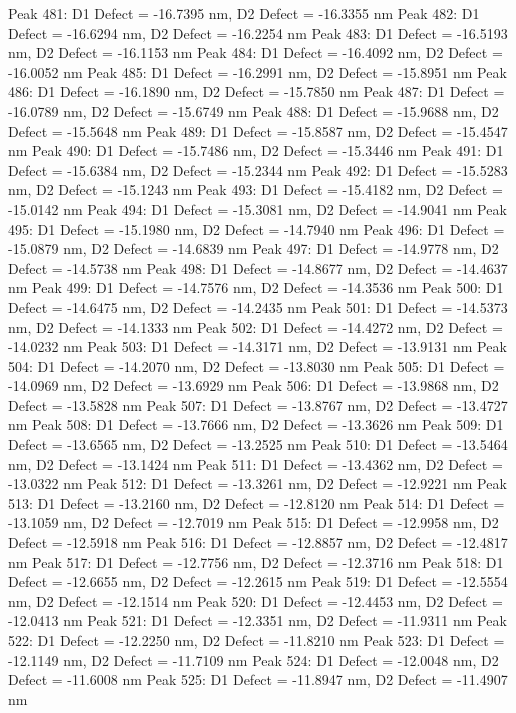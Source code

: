 \documentclass{article}
\begin{document}
Peak 481: D1 Defect = -16.7395 nm, D2 Defect = -16.3355 nm
Peak 482: D1 Defect = -16.6294 nm, D2 Defect = -16.2254 nm
Peak 483: D1 Defect = -16.5193 nm, D2 Defect = -16.1153 nm
Peak 484: D1 Defect = -16.4092 nm, D2 Defect = -16.0052 nm
Peak 485: D1 Defect = -16.2991 nm, D2 Defect = -15.8951 nm
Peak 486: D1 Defect = -16.1890 nm, D2 Defect = -15.7850 nm
Peak 487: D1 Defect = -16.0789 nm, D2 Defect = -15.6749 nm
Peak 488: D1 Defect = -15.9688 nm, D2 Defect = -15.5648 nm
Peak 489: D1 Defect = -15.8587 nm, D2 Defect = -15.4547 nm
Peak 490: D1 Defect = -15.7486 nm, D2 Defect = -15.3446 nm
Peak 491: D1 Defect = -15.6384 nm, D2 Defect = -15.2344 nm
Peak 492: D1 Defect = -15.5283 nm, D2 Defect = -15.1243 nm
Peak 493: D1 Defect = -15.4182 nm, D2 Defect = -15.0142 nm
Peak 494: D1 Defect = -15.3081 nm, D2 Defect = -14.9041 nm
Peak 495: D1 Defect = -15.1980 nm, D2 Defect = -14.7940 nm
Peak 496: D1 Defect = -15.0879 nm, D2 Defect = -14.6839 nm
Peak 497: D1 Defect = -14.9778 nm, D2 Defect = -14.5738 nm
Peak 498: D1 Defect = -14.8677 nm, D2 Defect = -14.4637 nm
Peak 499: D1 Defect = -14.7576 nm, D2 Defect = -14.3536 nm
Peak 500: D1 Defect = -14.6475 nm, D2 Defect = -14.2435 nm
Peak 501: D1 Defect = -14.5373 nm, D2 Defect = -14.1333 nm
Peak 502: D1 Defect = -14.4272 nm, D2 Defect = -14.0232 nm
Peak 503: D1 Defect = -14.3171 nm, D2 Defect = -13.9131 nm
Peak 504: D1 Defect = -14.2070 nm, D2 Defect = -13.8030 nm
Peak 505: D1 Defect = -14.0969 nm, D2 Defect = -13.6929 nm
Peak 506: D1 Defect = -13.9868 nm, D2 Defect = -13.5828 nm
Peak 507: D1 Defect = -13.8767 nm, D2 Defect = -13.4727 nm
Peak 508: D1 Defect = -13.7666 nm, D2 Defect = -13.3626 nm
Peak 509: D1 Defect = -13.6565 nm, D2 Defect = -13.2525 nm
Peak 510: D1 Defect = -13.5464 nm, D2 Defect = -13.1424 nm
Peak 511: D1 Defect = -13.4362 nm, D2 Defect = -13.0322 nm
Peak 512: D1 Defect = -13.3261 nm, D2 Defect = -12.9221 nm
Peak 513: D1 Defect = -13.2160 nm, D2 Defect = -12.8120 nm
Peak 514: D1 Defect = -13.1059 nm, D2 Defect = -12.7019 nm
Peak 515: D1 Defect = -12.9958 nm, D2 Defect = -12.5918 nm
Peak 516: D1 Defect = -12.8857 nm, D2 Defect = -12.4817 nm
Peak 517: D1 Defect = -12.7756 nm, D2 Defect = -12.3716 nm
Peak 518: D1 Defect = -12.6655 nm, D2 Defect = -12.2615 nm
Peak 519: D1 Defect = -12.5554 nm, D2 Defect = -12.1514 nm
Peak 520: D1 Defect = -12.4453 nm, D2 Defect = -12.0413 nm
Peak 521: D1 Defect = -12.3351 nm, D2 Defect = -11.9311 nm
Peak 522: D1 Defect = -12.2250 nm, D2 Defect = -11.8210 nm
Peak 523: D1 Defect = -12.1149 nm, D2 Defect = -11.7109 nm
Peak 524: D1 Defect = -12.0048 nm, D2 Defect = -11.6008 nm
Peak 525: D1 Defect = -11.8947 nm, D2 Defect = -11.4907 nm
\end{document}
